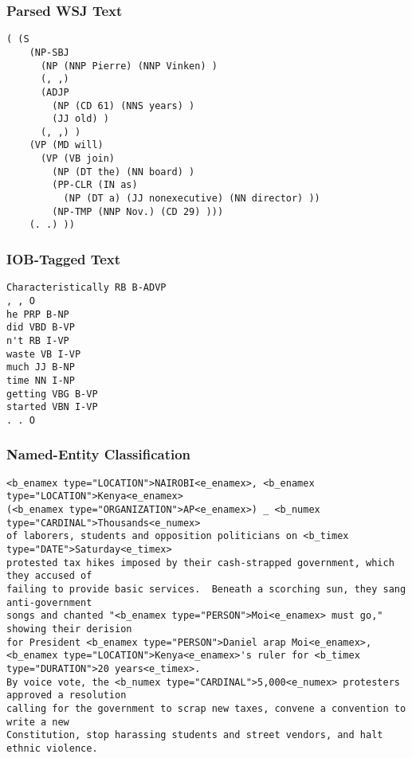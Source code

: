 \documentclass{beamer}             %
\begin{document}
\begin{frame}[fragile]
  \frametitle{Parsed WSJ Text}
{\scriptsize\begin{verbatim}
( (S
    (NP-SBJ
      (NP (NNP Pierre) (NNP Vinken) )
      (, ,)
      (ADJP
        (NP (CD 61) (NNS years) )
        (JJ old) )
      (, ,) )
    (VP (MD will)
      (VP (VB join)
        (NP (DT the) (NN board) )
        (PP-CLR (IN as)
          (NP (DT a) (JJ nonexecutive) (NN director) ))
        (NP-TMP (NNP Nov.) (CD 29) )))
    (. .) ))
\end{verbatim}}
\end{frame}

\begin{frame}[fragile]
  \frametitle{IOB-Tagged Text}
{\scriptsize\begin{verbatim}
Characteristically RB B-ADVP
, , O
he PRP B-NP
did VBD B-VP
n't RB I-VP
waste VB I-VP
much JJ B-NP
time NN I-NP
getting VBG B-VP
started VBN I-VP
. . O
\end{verbatim}}
\end{frame}

\begin{frame}[fragile]
  \frametitle{Named-Entity Classification}
{\tiny\begin{verbatim}
<b_enamex type="LOCATION">NAIROBI<e_enamex>, <b_enamex type="LOCATION">Kenya<e_enamex>
(<b_enamex type="ORGANIZATION">AP<e_enamex>) _ <b_numex type="CARDINAL">Thousands<e_numex>
of laborers, students and opposition politicians on <b_timex type="DATE">Saturday<e_timex>
protested tax hikes imposed by their cash-strapped government, which they accused of
failing to provide basic services.  Beneath a scorching sun, they sang anti-government
songs and chanted "<b_enamex type="PERSON">Moi<e_enamex> must go," showing their derision
for President <b_enamex type="PERSON">Daniel arap Moi<e_enamex>,
<b_enamex type="LOCATION">Kenya<e_enamex>'s ruler for <b_timex type="DURATION">20 years<e_timex>.
By voice vote, the <b_numex type="CARDINAL">5,000<e_numex> protesters approved a resolution
calling for the government to scrap new taxes, convene a convention to write a new
Constitution, stop harassing students and street vendors, and halt ethnic violence.
\end{verbatim}}
\end{frame}
\end{document}
